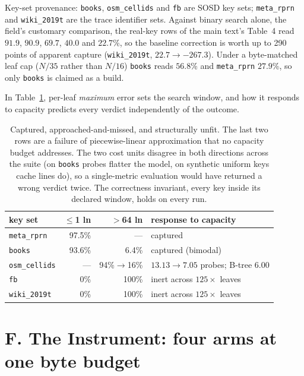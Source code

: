 \documentclass[letterpaper]{article} %
\begin{document}
\noindent Key-set provenance: \texttt{books}, \texttt{osm\_cellids} and \texttt{fb} are SOSD key
sets; \texttt{meta\_rprn} and \texttt{wiki\_2019t} are the trace identifier sets. Against binary
search alone, the field's customary comparison, the real-key rows of the main text's Table~4 read
$91.9$, $90.9$, $69.7$, $40.0$ and $22.7$\%, so the baseline correction is worth up to 290 points of
apparent capture (\texttt{wiki\_2019t}, $22.7\to-267.3$). Under a byte-matched leaf cap ($N/35$
rather than $N/16$) \texttt{books} reads $56.8$\% and \texttt{meta\_rprn} $27.9$\%, so only
\texttt{books} is claimed as a build.

\noindent In Table~\ref{tab:s-index}, per-leaf \emph{maximum} error sets the search window, and how it responds to capacity
predicts every verdict independently of the outcome.

\begin{table}[htbp]
\centering\footnotesize
\setlength{\tabcolsep}{3pt}
\begin{tabular}{lrrp{3.4cm}}
\toprule
key set & $\le$1 ln & $>$64 ln & response to capacity \\
\midrule
\texttt{meta\_rprn} & 97.5\% & --- & captured \\
\texttt{books} & 93.6\% & 6.4\% & captured (bimodal) \\
\texttt{osm\_cellids} & --- & 94\%$\to$16\% & $13.13\to7.05$ probes; B-tree $6.00$ \\
\texttt{fb} & 0\% & 100\% & inert across $125\times$ leaves \\
\texttt{wiki\_2019t} & 0\% & 100\% & inert across $125\times$ leaves \\
\bottomrule
\end{tabular}
\caption{Captured, approached-and-missed, and structurally unfit. The last two rows are a failure of
piecewise-linear approximation that no capacity budget addresses. The two cost units disagree in
both directions across the suite (on \texttt{books} probes flatter the model, on synthetic uniform
keys cache lines do), so a single-metric evaluation would have returned a wrong verdict twice. The
correctness invariant, every key inside its declared window, holds on every run.}
\label{tab:s-index}
\end{table}

\section{F. The Instrument: four arms at one byte budget}
\end{document}
